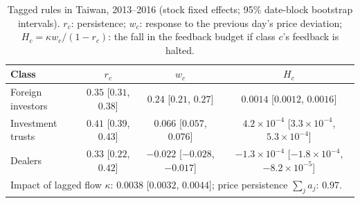 \documentclass[12pt]{article}
\theoremstyle{definition}
\theoremstyle{remark}
\begin{document}
\begin{table}[t]\centering\footnotesize\setlength{\tabcolsep}{4pt}
\caption{Tagged rules in Taiwan, 2013--2016 (stock fixed effects; 95\% date-block bootstrap intervals). $r_c$: persistence; $w_c$: response to the previous day's price deviation; $H_c=\kappa w_c/(1-r_c)$: the fall in the feedback budget if class $c$'s feedback is halted.}\label{tab:barrier}
\begin{tabular}{lccc}\toprule
Class & $r_c$ & $w_c$ & $H_c$\\\midrule
Foreign investors & $0.35$ [$0.31$, $0.38$] & $0.24$ [$0.21$, $0.27$] & $0.0014$ [$0.0012$, $0.0016$]\\
Investment trusts & $0.41$ [$0.39$, $0.43$] & $0.066$ [$0.057$, $0.076$] & $4.2\times10^{-4}$ [$3.3\times10^{-4}$, $5.3\times10^{-4}$]\\
Dealers & $0.33$ [$0.22$, $0.42$] & $-0.022$ [$-0.028$, $-0.017$] & $-1.3\times10^{-4}$ [$-1.8\times10^{-4}$, $-8.2\times10^{-5}$]\\
\midrule
\multicolumn{4}{l}{Impact of lagged flow $\kappa$: $0.0038$ [$0.0032$, $0.0044$]; price persistence $\sum_ja_j$: $0.97$.}\\
\bottomrule\end{tabular}\end{table}
\end{document}
